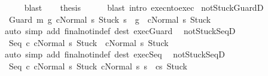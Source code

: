 \begin{isabellebody}
\ \ \ \ \isamarkupfalse%
\ blast\isanewline
\ \ \isamarkupfalse%
\ {\isacharquery}thesis\isanewline
\ \ \ \ \isamarkupfalse%
\ {\isacharparenleft}blast\ intro{\isacharcolon}\ execn{\isacharunderscore}to{\isacharunderscore}exec{\isacharparenright}\isanewline
{}\isamarkupfalse%
%
\endisatagproof
{\isafoldproof}%
%
\isadelimproof
\isanewline
%
\endisadelimproof
\isanewline
{}\isamarkupfalse%
\ notStuck{\isacharunderscore}GuardD{\isacharcolon}\ \isanewline
\ \ {\isachardoublequoteopen}{\isasymlbrakk}{\isasymGamma}{\isasymturnstile}{\isasymlangle}Guard\ m\ g\ c{\isacharcomma}Normal\ s{\isasymrangle}\ {\isasymRightarrow}{\isasymnotin}{\isacharbraceleft}Stuck{\isacharbraceright}{\isacharsemicolon}\ s\ {\isasymin}\ g{\isasymrbrakk}\ {\isasymLongrightarrow}\ {\isasymGamma}{\isasymturnstile}{\isasymlangle}c{\isacharcomma}Normal\ s{\isasymrangle}\ {\isasymRightarrow}{\isasymnotin}{\isacharbraceleft}Stuck{\isacharbraceright}{\isachardoublequoteclose}\isanewline
%
\isadelimproof
\ \ %
\endisadelimproof
%
\isatagproof
{}\isamarkupfalse%
\ {\isacharparenleft}auto\ simp\ add{\isacharcolon}\ final{\isacharunderscore}notin{\isacharunderscore}def\ dest{\isacharcolon}\ exec{\isachardot}Guard\ {\isacharparenright}%
\endisatagproof
{\isafoldproof}%
%
\isadelimproof
\isanewline
%
\endisadelimproof
\isanewline
{}\isamarkupfalse%
\ notStuck{\isacharunderscore}SeqD{}{\isacharcolon}\ \isanewline
\ \ {\isachardoublequoteopen}{\isasymlbrakk}{\isasymGamma}{\isasymturnstile}{\isasymlangle}Seq\ c{}\ c{}{\isacharcomma}Normal\ s{\isasymrangle}\ {\isasymRightarrow}{\isasymnotin}{\isacharbraceleft}Stuck{\isacharbraceright}{\isasymrbrakk}\ {\isasymLongrightarrow}\ {\isasymGamma}{\isasymturnstile}{\isasymlangle}c{}{\isacharcomma}Normal\ s{\isasymrangle}\ {\isasymRightarrow}{\isasymnotin}{\isacharbraceleft}Stuck{\isacharbraceright}{\isachardoublequoteclose}\isanewline
%
\isadelimproof
\ \ %
\endisadelimproof
%
\isatagproof
{}\isamarkupfalse%
\ {\isacharparenleft}auto\ simp\ add{\isacharcolon}\ final{\isacharunderscore}notin{\isacharunderscore}def\ dest{\isacharcolon}\ exec{\isachardot}Seq\ {\isacharparenright}%
\endisatagproof
{\isafoldproof}%
%
\isadelimproof
\isanewline
%
\endisadelimproof
\isanewline
\isanewline
{}\isamarkupfalse%
\ notStuck{\isacharunderscore}SeqD{}{\isacharcolon}\ \isanewline
\ \ {\isachardoublequoteopen}{\isasymlbrakk}{\isasymGamma}{\isasymturnstile}{\isasymlangle}Seq\ c{}\ c{}{\isacharcomma}Normal\ s{\isasymrangle}\ {\isasymRightarrow}{\isasymnotin}{\isacharbraceleft}Stuck{\isacharbraceright}{\isacharsemicolon}\ {\isasymGamma}{\isasymturnstile}{\isasymlangle}c{}{\isacharcomma}Normal\ s{\isasymrangle}\ {\isasymRightarrow}s{\isacharprime}{\isasymrbrakk}\ {\isasymLongrightarrow}\ {\isasymGamma}{\isasymturnstile}{\isasymlangle}c{}{\isacharcomma}s{\isacharprime}{\isasymrangle}\ {\isasymRightarrow}{\isasymnotin}{\isacharbraceleft}Stuck{\isacharbraceright}{\isachardoublequoteclose}\isanewline

\end{isabellebody}
